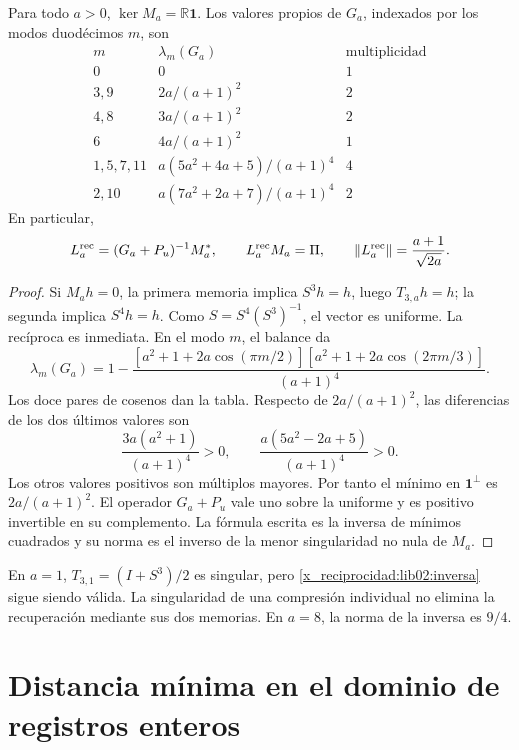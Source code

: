 \begin{theorem}
\label{x_reciprocidad:lib02:inversa-memorias}
Para todo \(a>0\), \(\ker M_a=\mathbb R\mathbf1\). Los valores
propios de \(G_a\), indexados por los modos duodécimos \(m\), son
\[
\begin{array}{c|c|c}
 m&\lambda_m(G_a)&\text{multiplicidad}\\\hline
 0&0&1\\
 3,9&2a/(a+1)^2&2\\
 4,8&3a/(a+1)^2&2\\
 6&4a/(a+1)^2&1\\
 1,5,7,11&a(5a^2+4a+5)/(a+1)^4&4\\
 2,10&a(7a^2+2a+7)/(a+1)^4&2
\end{array}
\]
En particular,
\begin{equation}
 L_a^{\rm rec}=(G_a+P_u)^{-1}M_a^*,\qquad
 L_a^{\rm rec}M_a=\Pi,\qquad
 \|L_a^{\rm rec}\|=\frac{a+1}{\sqrt{2a}}.
 \label{x_reciprocidad:lib02:inversa}
\end{equation}
\end{theorem}
\begin{proof}
Si \(M_ah=0\), la primera memoria implica \(S^3h=h\), luego
\(T_{3,a}h=h\); la segunda implica \(S^4h=h\). Como
\(S=S^4(S^3)^{-1}\), el vector es uniforme. La recíproca es
inmediata. En el modo \(m\), el balance da
\[
 \lambda_m(G_a)=1-
 \frac{[a^2+1+2a\cos(\pi m/2)]
 [a^2+1+2a\cos(2\pi m/3)]}{(a+1)^4}.
\]
Los doce pares de cosenos dan la tabla. Respecto de
\(2a/(a+1)^2\), las diferencias de los dos últimos valores son
\[
 \frac{3a(a^2+1)}{(a+1)^4}>0,\qquad
 \frac{a(5a^2-2a+5)}{(a+1)^4}>0.
\]
Los otros valores positivos son múltiplos mayores. Por tanto el mínimo
en \(\mathbf1^\perp\) es \(2a/(a+1)^2\). El operador
\(G_a+P_u\) vale uno sobre la uniforme y es positivo invertible en
su complemento. La fórmula escrita es la inversa de mínimos cuadrados
y su norma es el inverso de la menor singularidad no nula de \(M_a\).
\end{proof}

En \(a=1\), \(T_{3,1}=(I+S^3)/2\) es singular, pero
\eqref{x_reciprocidad:lib02:inversa} sigue siendo válida. La singularidad de una
compresión individual no elimina la recuperación mediante sus dos
memorias. En \(a=8\), la norma de la inversa es \(9/4\).

\section{Distancia mínima en el dominio de registros enteros}
\label{x_reciprocidad:lib02:redes}

